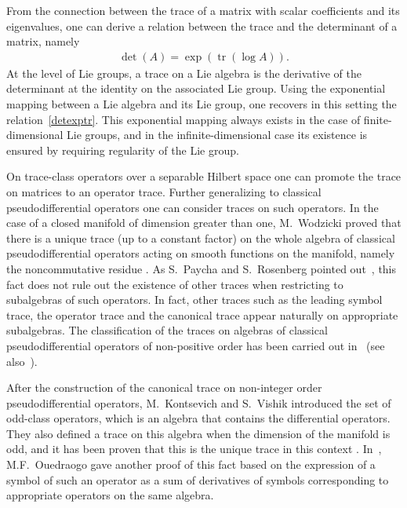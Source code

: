 \documentclass[pdftex]{sigma}
\DeclareMathOperator{\tr}{tr} \DeclareMathOperator{\Log}{Log}
\begin{document}
  From the connection between the trace of a matrix with scalar coef\/f\/icients and its eigenvalues, one can derive a relation between the trace and the determinant of a matrix, namely
\begin{gather}
\det(A)=\exp(\tr(\log A)). \label{detexptr}
\end{gather}
At the level of Lie groups, a trace on a Lie algebra is the derivative of the determinant at the identity on the associated Lie group. Using the exponential mapping between a Lie algebra and its Lie group, one recovers in this setting the relation~\eqref{detexptr}. This exponential mapping always exists in the case of f\/inite-dimensional Lie groups, and in the inf\/inite-dimensional case its existence is ensured by requiring regularity of the Lie group.

On trace-class operators over a separable Hilbert space one can promote the trace on matrices to an operator trace. Further generalizing to classical pseudodif\/ferential operators one can consider traces on such operators. In the case of a closed manifold of dimension greater than one, M.~Wodzicki proved that there is a unique trace (up to a constant factor) on the whole algebra of classical pseudodif\/ferential operators acting on smooth functions on the manifold, namely the noncommutative residue \cite{wodzicki}. As S.~Paycha and S.~Rosenberg pointed out~\cite{rosenberg}, this fact does not rule out the existence of other traces when restricting to subalgebras of such operators. In fact, other traces such as the leading symbol trace, the operator trace and the canonical trace appear naturally on appropriate subalgebras. The classif\/ication of the traces on algebras of classical pseudodif\/ferential operators of non-positive order has been carried out in~\cite{neirathesis} (see also~\cite{leschneira}).

After the construction of the canonical trace on non-integer order pseudodif\/ferential operators, M.~Kontsevich and S.~Vishik \cite{kontsevichdeterminant} introduced the set of odd-class operators, which is an algebra that contains the dif\/ferential operators. They also def\/ined a trace on this algebra when the dimension of the manifold is odd, and it has been proven that this is the unique trace in this context \cite{maniccia, sylvie,ponge}. In~\cite{ouedraogothese}, M.F.~Ouedraogo gave another proof of this fact based on the expression of a symbol of such an operator as a sum of derivatives of symbols corresponding to appropriate operators on the same algebra.
\end{document}
